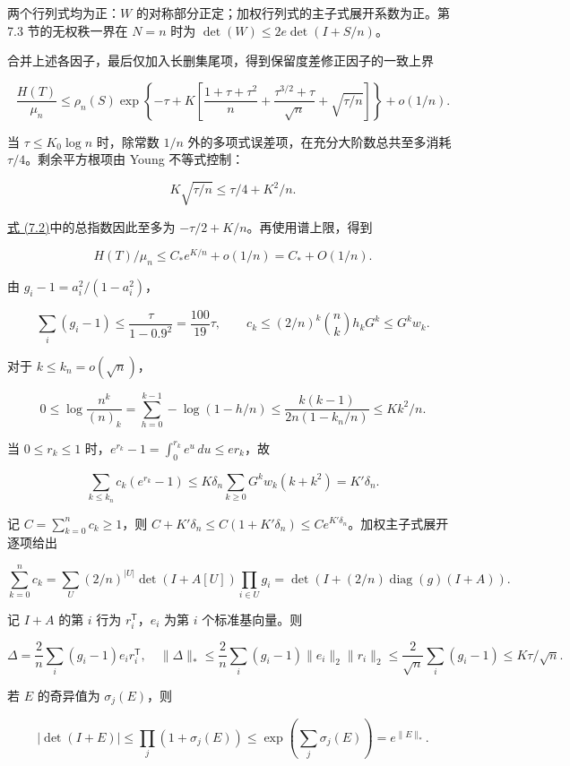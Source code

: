 \documentclass[11pt,a4paper]{article}
\begin{document}
两个行列式均为正：\(W\) 的对称部分正定；加权行列式的主子式展开系数为正。第 7.3 节的无权秩一界在 \(N=n\) 时为 \(\det(W)\le2e\det(I+S/n)\)。

合并上述各因子，最后仅加入长删集尾项，得到保留度差修正因子的一致上界


\begin{equation}
\frac{H(T)}{\mu_n}\le
\rho_n(S)\exp\left\{-\tau+
K\left[\frac{1+\tau+\tau^2}{n}
+\frac{\tau^{3/2}+\tau}{\sqrt n}+\sqrt{\tau/n}\right]\right\}
+o(1/n).
\tag{7.2}
\label{eq-score-penalty}
\end{equation}

当 \(\tau\le K_0\log n\) 时，除常数 \(1/n\) 外的多项式误差项，在充分大阶数总共至多消耗 \(\tau/4\)。剩余平方根项由 Young 不等式控制：

\[K\sqrt{\tau/n}\le\tau/4+K^2/n.\]

\hyperref[eq-score-penalty]{式 (7.2)}中的总指数因此至多为 \(-\tau/2+K/n\)。再使用谱上限，得到

\[H(T)/\mu_n\le C_*e^{K/n}+o(1/n)=C_*+O(1/n).\]

由 \(g_i-1=a_i^2/(1-a_i^2)\)，

\[\sum_i(g_i-1)\le\frac{\tau}{1-0.9^2}=\frac{100}{19}\tau,
\qquad
c_k\le(2/n)^k\binom nk h_kG^k\le G^kw_k.\]

对于 \(k\le k_n=o(\sqrt n)\)，

\[0\le\log\frac{n^k}{(n)_k}
=\sum_{h=0}^{k-1}-\log(1-h/n)
\le\frac{k(k-1)}{2n(1-k_n/n)}\le Kk^2/n.\]

当 \(0\le r_k\le1\) 时，\(e^{r_k}-1=\int_0^{r_k}e^u\,du\le er_k\)，故

\[\sum_{k\le k_n}c_k(e^{r_k}-1)
\le K\delta_n\sum_{k\ge0}G^kw_k(k+k^2)=K'\delta_n.\]

记 \(C=\sum_{k=0}^nc_k\ge1\)，则 \(C+K'\delta_n\le C(1+K'\delta_n)\le Ce^{K'\delta_n}\)。加权主子式展开逐项给出

\[\sum_{k=0}^nc_k
=\sum_U(2/n)^{|U|}\det(I+A[U])\prod_{i\in U}g_i
=\det(I+(2/n)\operatorname{diag}(g)(I+A)).\]

记 \(I+A\) 的第 \(i\) 行为 \(r_i^{\mathsf T}\)，\(e_i\) 为第 \(i\) 个标准基向量。则

\[\Delta=\frac2n\sum_i(g_i-1)e_ir_i^{\mathsf T},\quad
\|\Delta\|_*\le\frac2n\sum_i(g_i-1)\|e_i\|_2\|r_i\|_2
\le\frac2{\sqrt n}\sum_i(g_i-1)\le K\tau/\sqrt n.\]

若 \(E\) 的奇异值为 \(\sigma_j(E)\)，则

\[|\det(I+E)|\le\prod_j(1+\sigma_j(E))
\le\exp\left(\sum_j\sigma_j(E)\right)=e^{\|E\|_*}.\]
\end{document}

